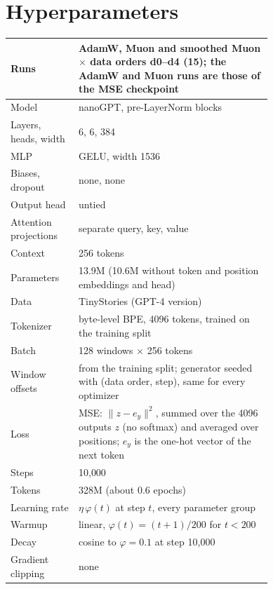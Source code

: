 \section{Hyperparameters}
\label{app:hparams}

\begin{center}\small
\captionsetup{type=table}
\caption{Hyperparameters shared by the AdamW, Muon and smoothed-Muon runs.}
\label{tab:app-shared}
\begin{tabular}{@{}lp{0.74\linewidth}@{}}
\hline
Runs & AdamW, Muon and smoothed Muon $\times$ data orders d0--d4 (15); the AdamW and Muon runs are those of the MSE
  checkpoint \\
\hline
Model & nanoGPT, pre-LayerNorm blocks \\
Layers, heads, width & 6, 6, 384 \\
MLP & GELU, width 1536 \\
Biases, dropout & none, none \\
Output head & untied \\
Attention projections & separate query, key, value \\
Context & 256 tokens \\
Parameters & 13.9M (10.6M without token and position embeddings and head) \\
\hline
Data & TinyStories (GPT-4 version) \\
Tokenizer & byte-level BPE, 4096 tokens, trained on the training split \\
Batch & 128 windows $\times$ 256 tokens \\
Window offsets & from the training split; generator seeded with (data order, step), same for every optimizer \\
\hline
Loss & MSE: $\|z-e_y\|^2$, summed over the 4096 outputs $z$ (no softmax) and averaged over positions; $e_y$ is the
  one-hot vector of the next token \\
Steps & 10{,}000 \\
Tokens & 328M (about 0.6 epochs) \\
Learning rate & $\eta\,\varphi(t)$ at step $t$, every parameter group \\
Warmup & linear, $\varphi(t)=(t+1)/200$ for $t<200$ \\
Decay & cosine to $\varphi=0.1$ at step 10{,}000 \\
Gradient clipping & none \\
\hline

\end{tabular}
\end{center}
